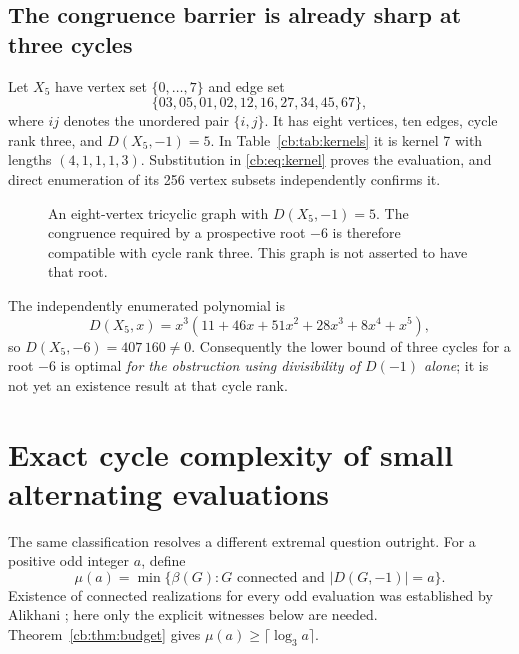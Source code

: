 \documentclass[11pt]{article}
\numberwithin{equation}{section}
\theoremstyle{definition}
\begin{document}
\subsection{The congruence barrier is already sharp at three cycles}\label{cb:sec:sharp3}
Let $X_5$ have vertex set $\{0,\ldots,7\}$ and edge set
\begin{equation}\label{cb:eq:h5}
 \{03,05,01,02,12,16,27,34,45,67\},
\end{equation}
where $ij$ denotes the unordered pair $\{i,j\}$. It has eight vertices,
ten edges, cycle rank three, and $D(X_5,-1)=5$. In Table~\ref{cb:tab:kernels}
it is kernel 7 with lengths $(4,1,1,1,3)$. Substitution in
\eqref{cb:eq:kernel} proves the evaluation, and direct enumeration of its
256 vertex subsets independently confirms it.

\begin{figure}[htbp]
\centering
{}
\caption{An eight-vertex tricyclic graph with $D(X_5,-1)=5$.
The congruence required by a prospective root $-6$ is therefore compatible
with cycle rank three. This graph is not asserted to have that root.}
\end{figure}

The independently enumerated polynomial is
\[
 D(X_5,x)=x^3(11+46x+51x^2+28x^3+8x^4+x^5),
\]
so $D(X_5,-6)=407\,160\ne0$.
Consequently the lower bound of three cycles for a root $-6$ is optimal
\emph{for the obstruction using divisibility of $D(-1)$ alone}; it is not
yet an existence result at that cycle rank.

\section{Exact cycle complexity of small alternating evaluations}

The same classification resolves a different extremal question outright.
For a positive odd integer $a$, define
\[
 \mu(a)=\min\{\beta(G):G\text{ connected and }|D(G,-1)|=a\}.
\]
Existence of connected realizations for every odd evaluation was established
by Alikhani \cite{AlikhaniMinusOne}; here only the explicit witnesses below
are needed. Theorem~\ref{cb:thm:budget} gives
$\mu(a)\ge\lceil\log_3 a\rceil$.
\end{document}
